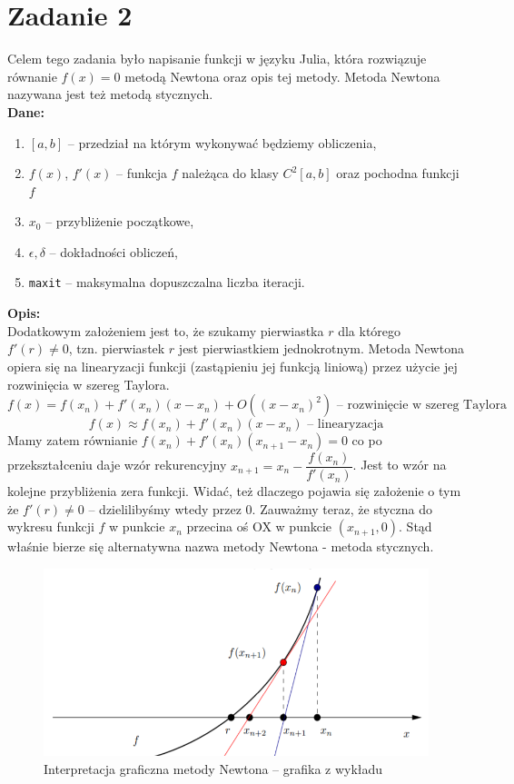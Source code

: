 \documentclass[]{article}
\begin{document}
	
	\clearpage
	
	\section*{Zadanie 2}
	
	Celem tego zadania było napisanie funkcji w języku Julia, która rozwiązuje równanie $f(x) = 0$ metodą Newtona oraz opis tej metody. Metoda Newtona nazywana jest też metodą stycznych.\\
	\textbf{Dane:}
	\begin{enumerate}[]
		\item $[a,b]$ -- przedział na którym wykonywać będziemy obliczenia,
		\item $f(x)$, $f'(x)$  -- funkcja $f$ należąca do klasy $C^2[a,b]$ oraz pochodna funkcji $f$
		\item $x_0$ -- przybliżenie początkowe,
		\item $\epsilon, \delta$ -- dokładności obliczeń,
		\item \texttt{maxit} -- maksymalna dopuszczalna liczba iteracji.
	\end{enumerate}
	\textbf{Opis:}\\
	Dodatkowym założeniem jest to, że szukamy pierwiastka $r$ dla którego $f'(r)\ne0$, tzn. pierwiastek $r$ jest pierwiastkiem jednokrotnym. Metoda Newtona opiera się na linearyzacji funkcji (zastąpieniu jej funkcją liniową) przez użycie jej rozwinięcia w szereg Taylora.
	$$f(x) = f(x_n ) + f'(x_n )(x-x_n) + O((x-x_n )^2)\text{ -- rozwinięcie w szereg Taylora}$$
	$$f(x)\approx f(x_n ) + f'(x_n )(x-x_n) \text{ -- linearyzacja}$$
	Mamy zatem równianie $f(x_n ) + f'(x_n )(x_{n+1}-x_n) = 0$ co po przekształceniu daje wzór rekurencyjny $x_{n+1} = x_n - \dfrac{f(x_n)}{f'(x_n)}$. Jest to wzór na kolejne przybliżenia zera funkcji. Widać, też dlaczego pojawia się założenie o tym że $f'(r)\ne0$ -- dzielilibyśmy wtedy przez 0. Zauważmy teraz, że styczna do wykresu funkcji $f$ w punkcie $x_n$ przecina oś OX w punkcie $(x_{n+1},0)$. Stąd właśnie bierze się alternatywna nazwa metody Newtona - metoda stycznych.
	\begin{figure}[!htbp]
		\includegraphics[scale=0.7]{newton}
		\centering
		\caption{Interpretacja graficzna metody Newtona -- grafika z wykładu}
	\end{figure}
\end{document}

